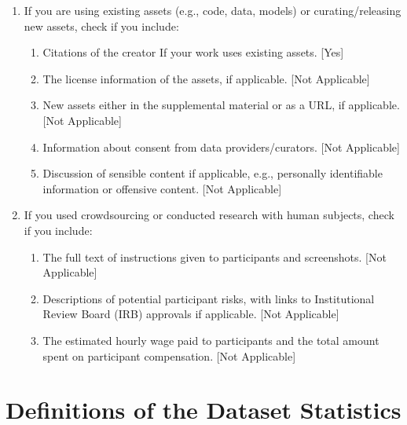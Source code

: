 \documentclass[twoside]{article}
\begin{document}
\begin{enumerate}
  \item If you are using existing assets (e.g., code, data, models) or curating/releasing new assets, check if you include:
  \begin{enumerate}
    \item Citations of the creator If your work uses existing assets. [Yes]
    \item The license information of the assets, if applicable. [Not Applicable]
    \item New assets either in the supplemental material or as a URL, if applicable. [Not Applicable]
    \item Information about consent from data providers/curators. [Not Applicable]
    \item Discussion of sensible content if applicable, e.g., personally identifiable information or offensive content. [Not Applicable]
  \end{enumerate}

  \item If you used crowdsourcing or conducted research with human subjects, check if you include:
  \begin{enumerate}
    \item The full text of instructions given to participants and screenshots. [Not Applicable]
    \item Descriptions of potential participant risks, with links to Institutional Review Board (IRB) approvals if applicable. [Not Applicable]
    \item The estimated hourly wage paid to participants and the total amount spent on participant compensation. [Not Applicable]
  \end{enumerate}

\end{enumerate}

\clearpage
\appendix
\thispagestyle{empty}

\onecolumn
{}

\section{Definitions of the Dataset Statistics}
\label{app:stats}
\end{document}
